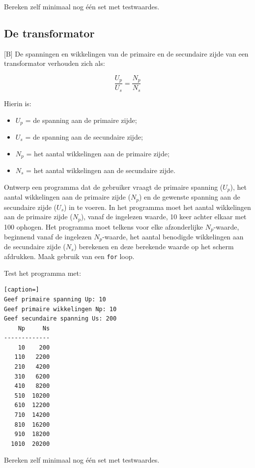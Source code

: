 \documentclass[a4paper,10pt,fleqn,twoside]{article}
\begin{document}
Bereken zelf minimaal nog één set met testwaardes.

\subsection{De transformator}[B]
De spanningen en wikkelingen van de primaire en de secundaire zijde van een transformator verhouden zich als:

\begin{equation*}
\dfrac{U_p}{U_s} = \dfrac{N_p}{N_s}
\end{equation*}

Hierin is:
\begin{itemize}
\item $U_p$ = de spanning aan de primaire zijde;
\item $U_s$ = de spanning aan de secundaire zijde;
\item $N_p$ = het aantal wikkelingen aan de primaire zijde;
\item $N_s$ = het aantal wikkelingen aan de secundaire zijde.
\end{itemize}

Ontwerp een programma dat de gebruiker vraagt de primaire spanning ($U_p$), het aantal wikkelingen aan de primaire zijde ($N_p$) en de gewenste spanning aan de secundaire zijde ($U_s$) in te voeren. In het programma moet het aantal wikkelingen aan de primaire zijde ($N_p$), vanaf de ingelezen waarde, 10 keer achter elkaar met 100 ophogen. Het programma moet telkens voor elke afzonderlijke $N_p$-waarde, beginnend vanaf de ingelezen $N_p$-waarde, het aantal benodigde wikkelingen aan de secundaire zijde ($N_s$) berekenen en deze berekende waarde op het scherm afdrukken. Maak gebruik van een \lstinline|for| loop.

Test het programma met:

\begin{lstlisting}[caption=]
Geef primaire spanning Up: 10
Geef primaire wikkelingen Np: 10
Geef secundaire spanning Us: 200
    Np     Ns
-------------
    10    200
   110   2200
   210   4200
   310   6200
   410   8200
   510  10200
   610  12200
   710  14200
   810  16200
   910  18200
  1010  20200
\end{lstlisting}


Bereken zelf minimaal nog één set met testwaardes.
\end{document}
